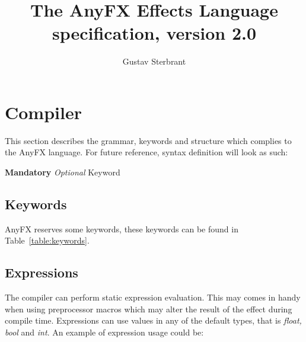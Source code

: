 \documentclass{article}
\newcommand{\SyntaxBox}[1]
{	
	\begin{center}
	\colorbox{orange!60}
	{
		\begin{minipage}{\linewidth}
		\hfill
		\begin{tabbing}
		#1
		\end{tabbing}
		\end{minipage}
	}
	\end{center}
}
\begin{document}
\title{The AnyFX Effects Language specification, version 2.0}
\author{Gustav Sterbrant}
\date{}
\maketitle

\clearpage
\tableofcontents
\clearpage

\section{Compiler}
This section describes the grammar, keywords and structure which complies to the AnyFX language. For future reference, syntax definition will look as such:

\SyntaxBox
{
	\textbf{Mandatory} \textit{Optional} Keyword
}

\subsection{Keywords}
AnyFX reserves some keywords, these keywords can be found in Table~\ref{table:keywords}.

\begin{table}[hp]
\centering
\caption{Keywords}
\label{table:keywords}
\end{table}

\subsection{Expressions}
The compiler can perform static expression evaluation. This may comes in handy when using preprocessor macros which may alter the result of the effect during compile time. Expressions can use values in any of the default types, that is \textit{float, bool} and \textit{int}. An example of expression usage could be:
\end{document}
